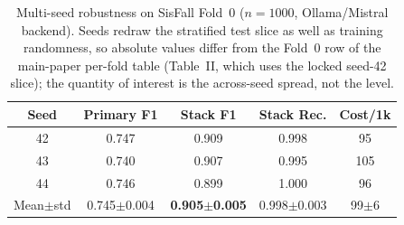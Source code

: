 \begin{table}[!t]
\centering
\caption{Multi-seed robustness on SisFall Fold~0 ($n{=}1000$, Ollama/Mistral backend). Seeds redraw the stratified test slice as well as training randomness, so absolute values differ from the Fold~0 row of the main-paper per-fold table (Table~II, which uses the locked seed-42 slice); the quantity of interest is the across-seed spread, not the level.}
\label{tab:seeds}
\setlength{\tabcolsep}{3pt}
\begin{tabular}{ccccc}
\toprule
Seed & Primary F1 & Stack F1 & Stack Rec. & Cost/1k \\
\midrule
42 & 0.747 & 0.909 & 0.998 & 95 \\
43 & 0.740 & 0.907 & 0.995 & 105 \\
44 & 0.746 & 0.899 & 1.000 & 96 \\
\midrule
Mean$\pm$std & 0.745$\pm$0.004 & \textbf{0.905$\pm$0.005} & 0.998$\pm$0.003 & 99$\pm$6 \\
\bottomrule
\end{tabular}
\end{table}
